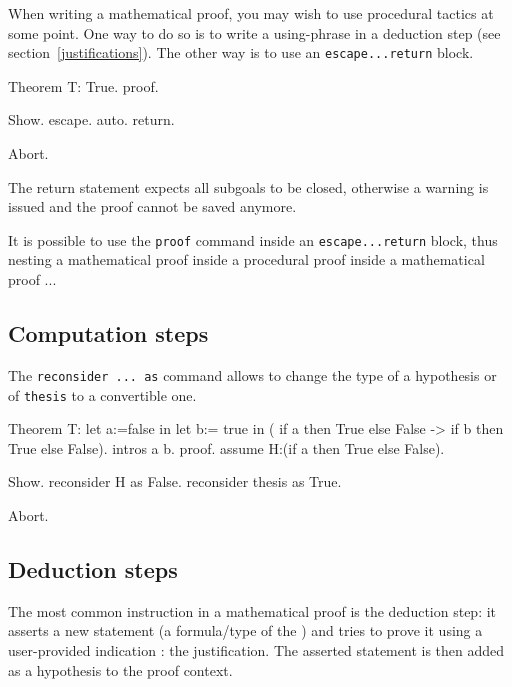 When writing a mathematical proof, you may wish to use procedural
tactics at some point. One way to do so is to write a using-{}phrase
in a deduction step (see section~\ref{justifications}). The other way
is to use an {\texttt{escape...return}} block.

\begin{coq_eval}  
Theorem T: True.
proof.
\end{coq_eval}
\begin{coq_example}
 Show.
 escape.
 auto.
 return.
\end{coq_example}
\begin{coq_eval}
Abort.
\end{coq_eval}

The return statement expects all subgoals to be closed, otherwise a
warning is issued and the proof cannot be saved anymore.

It is possible to use the {\texttt{proof}} command inside an
{\texttt{escape...return}} block, thus nesting a mathematical proof
inside a procedural proof inside a mathematical proof ...

\subsection{Computation steps}

The {\tt reconsider ... as} command allows to change the type of a hypothesis or of {\tt thesis} to a convertible one.

\begin{coq_eval}
Theorem T: let a:=false in let b:= true in ( if a then True else False -> if b then True else False).
intros a b.
proof.
assume H:(if a then True else False).
\end{coq_eval}
\begin{coq_example}
 Show.
 reconsider H as False.
 reconsider thesis as True.
\end{coq_example}
\begin{coq_eval}
Abort.
\end{coq_eval}


\subsection{Deduction steps}

The most common instruction in a mathematical proof is the deduction step:
 it asserts a new statement (a formula/type of the \CIC) and tries to prove it using a user-provided indication : the justification. The asserted statement is then added as a hypothesis to the proof context.

